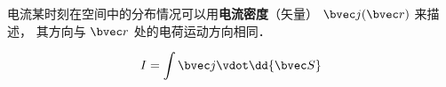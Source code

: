 

电流某时刻在空间中的分布情况可以用\textbf{电流密度}（矢量） $\bvec j(\bvec r)$ 来描述， 其方向与 $\bvec r$ 处的电荷运动方向相同．


\begin{equation}
I = \int \bvec j \vdot \dd{\bvec S}
\end{equation}
